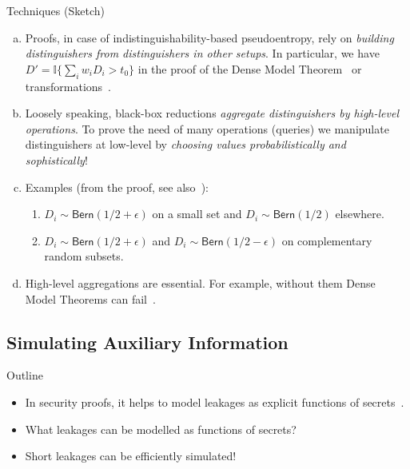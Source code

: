 \documentclass[9pt]{beamer}					%
\begin{document}
\begin{frame}{Techniques (Sketch)}
\newcommand{\D}{\mathsf{\D}}
\begin{enumerate}[(a)]
    \item Proofs, in case of indistinguishability-based pseudoentropy, rely on \emph{building distinguishers from distinguishers in other setups}. In particular, we have 
    $D' = \mathbb{I}\{\sum_i w_i D_i > t_0\}$  in the proof of the Dense Model Theorem~\cite{DBLP:journals/eccc/Zhang11} or transformations~\cite{DBLP:conf/random/BarakSW03,skorski2015new}.
    \item Loosely speaking, black-box reductions \emph{aggregate distinguishers by high-level operations}. To prove the need of many operations (queries) we manipulate distinguishers at low-level by \emph{choosing values probabilistically and sophistically}!
    \item Examples (from the proof, see also~\cite{Chen_2018}): 
    \begin{enumerate}[(1)]
    \item $D_i\sim \mathsf{Bern}(1/2+\epsilon)$ on a small set and $D_i\sim \mathsf{Bern}(1/2)$ elsewhere.
    \item $D_i\sim \mathsf{Bern}(1/2+\epsilon)$ and $D_i\sim \mathsf{Bern}(1/2-\epsilon)$ on complementary random subsets.
    \end{enumerate}
    \item[\emoji{warning}] High-level aggregations are essential. For example, without them Dense Model Theorems can fail~\cite{impagliazzo2020comparing}.
\end{enumerate}
\end{frame}

\subsection{Simulating Auxiliary Information }

\begin{frame}{Outline}
\begin{itemize}
\item[\emoji{open-book}] In security proofs, it helps to model leakages as explicit functions of secrets~\cite{DBLP:conf/tcc/JetchevP14}.
\item[\emoji{question}] What leakages can be modelled as functions of secrets?
\item[\emoji{raised-hand}] Short leakages can be efficiently simulated!
\end{itemize}
\end{frame}
\end{document}
